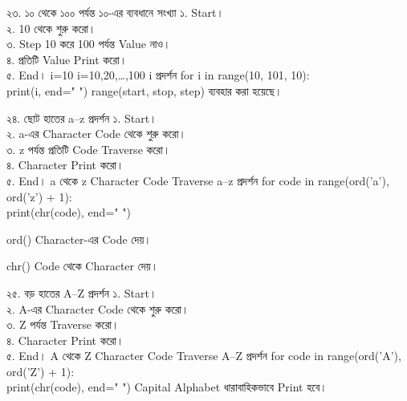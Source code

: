 
\exerciseTable
{২৩. ১০ থেকে ১০০ পর্যন্ত ১০-এর ব্যবধানে সংখ্যা}
{
১. Start।\\
২. 10 থেকে শুরু করো।\\
৩. Step 10 করে 100 পর্যন্ত Value নাও।\\
৪. প্রতিটি Value Print করো।\\
৫. End।
}
{
\linearflow
{i=10}
{i=10,20,\dots,100}
{i প্রদর্শন}
}
{
for i in range(10, 101, 10):\\
\hspace*{4mm}print(i, end=" ")
}
{
\textenglish{\ttfamily range(start, stop, step)}
ব্যবহার করা হয়েছে।
}


\exerciseTable
{২৪. ছোট হাতের a--z প্রদর্শন}
{
১. Start।\\
২. a-এর Character Code থেকে শুরু করো।\\
৩. z পর্যন্ত প্রতিটি Code Traverse করো।\\
৪. Character Print করো।\\
৫. End।
}
{
\linearflow
{a থেকে z}
{Character Code Traverse}
{a--z প্রদর্শন}
}
{
for code in range(ord('a'), ord('z') + 1):\\
\hspace*{4mm}print(chr(code), end=" ")
}
{
\textenglish{\ttfamily ord()}
Character-এর Code দেয়।

\medskip

\textenglish{\ttfamily chr()}
Code থেকে Character দেয়।
}


\exerciseTable
{২৫. বড় হাতের A--Z প্রদর্শন}
{
১. Start।\\
২. A-এর Character Code থেকে শুরু করো।\\
৩. Z পর্যন্ত Traverse করো।\\
৪. Character Print করো।\\
৫. End।
}
{
\linearflow
{A থেকে Z}
{Character Code Traverse}
{A--Z প্রদর্শন}
}
{
for code in range(ord('A'), ord('Z') + 1):\\
\hspace*{4mm}print(chr(code), end=" ")
}
{
Capital Alphabet ধারাবাহিকভাবে Print হবে।
}



